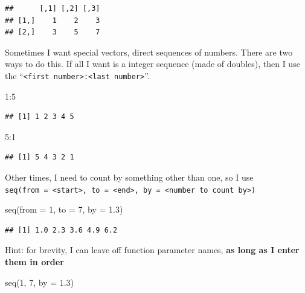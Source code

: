 \documentclass[
]{book}
\newenvironment{Shaded}{\begin{snugshade}}{\end{snugshade}}
\newcommand{\AttributeTok}[1]{\textcolor[rgb]{0.77,0.63,0.00}{#1}}
\newcommand{\DecValTok}[1]{\textcolor[rgb]{0.00,0.00,0.81}{#1}}
\newcommand{\FloatTok}[1]{\textcolor[rgb]{0.00,0.00,0.81}{#1}}
\newcommand{\FunctionTok}[1]{\textcolor[rgb]{0.00,0.00,0.00}{#1}}
\newcommand{\NormalTok}[1]{#1}
\newcommand{\SpecialCharTok}[1]{\textcolor[rgb]{0.00,0.00,0.00}{#1}}
\begin{document}
\begin{verbatim}
##      [,1] [,2] [,3]
## [1,]    1    2    3
## [2,]    3    5    7
\end{verbatim}

Sometimes I want special vectors, direct sequences of numbers. There are two ways to do this. If all I want is a integer sequence (made of doubles), then I use the ``\texttt{\textless{}first\ number\textgreater{}:\textless{}last\ number\textgreater{}}''.

\begin{Shaded}
\begin{Highlighting}[]
\DecValTok{1}\SpecialCharTok{:}\DecValTok{5}
\end{Highlighting}
\end{Shaded}

\begin{verbatim}
## [1] 1 2 3 4 5
\end{verbatim}

\begin{Shaded}
\begin{Highlighting}[]
\DecValTok{5}\SpecialCharTok{:}\DecValTok{1}
\end{Highlighting}
\end{Shaded}

\begin{verbatim}
## [1] 5 4 3 2 1
\end{verbatim}

Other times, I need to count by something other than one, so I use \texttt{seq(from\ =\ \textless{}start\textgreater{},\ to\ =\ \textless{}end\textgreater{},\ by\ =\ \textless{}number\ to\ count\ by\textgreater{})}

\begin{Shaded}
\begin{Highlighting}[]
\FunctionTok{seq}\NormalTok{(}\AttributeTok{from =} \DecValTok{1}\NormalTok{, }\AttributeTok{to =} \DecValTok{7}\NormalTok{, }\AttributeTok{by =} \FloatTok{1.3}\NormalTok{)}
\end{Highlighting}
\end{Shaded}

\begin{verbatim}
## [1] 1.0 2.3 3.6 4.9 6.2
\end{verbatim}

Hint: for brevity, I can leave off function parameter names, \textbf{as long as I enter them in order}

\begin{Shaded}
\begin{Highlighting}[]
\FunctionTok{seq}\NormalTok{(}\DecValTok{1}\NormalTok{, }\DecValTok{7}\NormalTok{, }\AttributeTok{by =} \FloatTok{1.3}\NormalTok{)}
\end{Highlighting}
\end{Shaded}
\end{document}
